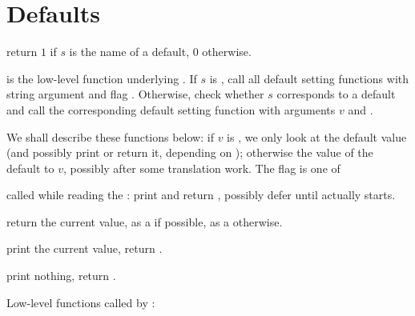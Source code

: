 \section{Defaults}

 return $1$ if $s$ is the name
of a default, $0$ otherwise.

 is the
low-level function underlying . If $s$ is , call all
default setting functions with string argument  and flag
. Otherwise, check whether $s$ corresponds to a default
and call the corresponding default setting function with arguments $v$ and
\fl.

We shall describe these functions below: if $v$ is , we only look
at the default value (and possibly print or return it, depending on
); otherwise the value of the default to $v$, possibly after some
translation work. The flag is one of

\item {} called while reading the : print and return
, possibly defer until  actually starts.

\item {} return the current value, as a  if possible, as
a  otherwise.

\item {} print the current value, return .

\item {} print nothing, return .

\noindent Low-level functions called by :










